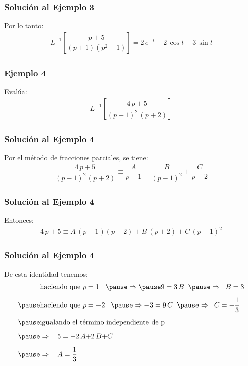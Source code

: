 \begin{frame}
\frametitle{Solución al Ejemplo 3}
Por lo tanto:
\pause
\begin{align*}
L^{-1} \left[ \dfrac{p + 5}{(p + 1)(p^{2} + 1)} \right] = 2 \, e^{-t} - 2 \, \cos t +  3 \, \sin t
\end{align*}
\end{frame}
\begin{frame}
\frametitle{Ejemplo 4}
Evalúa:
\pause
\begin{align*}
L^{-1} \left[ \dfrac{4 \, p + 5}{(p - 1)^{2} \, (p + 2)} \right]
\end{align*}
\end{frame}
\begin{frame}
\frametitle{Solución al Ejemplo 4}
Por el método de fracciones parciales, se tiene:
\pause
\begin{align*}
\dfrac{4 \, p + 5}{(p - 1)^{2} \, (p + 2)} \equiv \dfrac{A}{p - 1} + \dfrac{B}{(p - 1)^{2}} + \dfrac{C}{p + 2}
\end{align*}
\end{frame}
\begin{frame}
\frametitle{Solución al Ejemplo 4}
Entonces:
\pause
\begin{align*}
4 \, p + 5 \equiv A \, (p - 1)(p + 2) + B \, (p + 2) + C \, (p - 1)^{2}
\end{align*}
\end{frame}
\begin{frame}
\frametitle{Solución al Ejemplo 4}
De esta identidad tenemos:
\pause
\begin{eqnarray*}
\begin{aligned}
&\mbox{haciendo que } p = 1 \hspace{0.3cm} \pause \Rightarrow \pause 9 = 3 \, B \hspace{0.2cm} \pause \Rightarrow \hspace{0.2cm} B = 3 \\[0.5em] \pause
&\mbox{haciendo que } p = -2 \hspace{0.3cm} \pause \Rightarrow - 3 = 9 \, C \hspace{0.2cm} \pause \Rightarrow \hspace{0.2cm} C = -\dfrac{1}{3} \\[0.5em] \pause
&\mbox{igualando el término independiente de p}  \\[0.5em] \pause
&\Rightarrow \hspace{0.3cm} 5 = -2 \, A {+}  2 \, B {+} C \\[0.5em] \pause
&\Rightarrow \hspace{0.3cm} A = \dfrac{1}{3}
\end{aligned}
\end{eqnarray*}
\end{frame}
